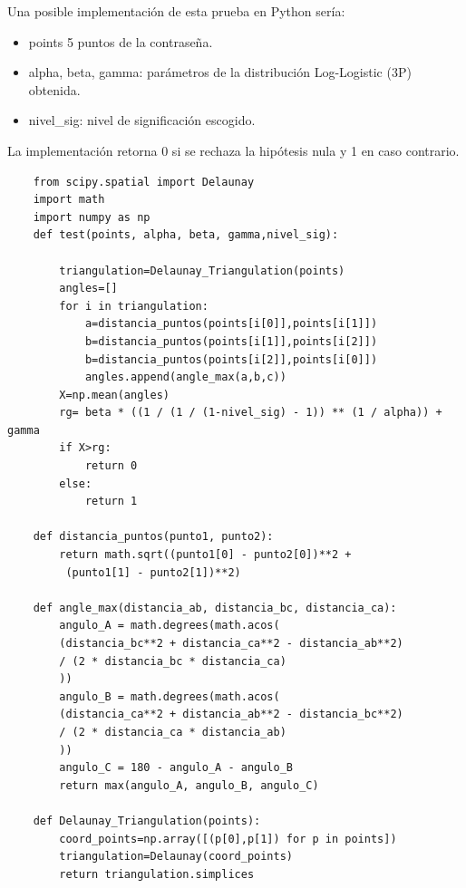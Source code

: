 \documentclass[12pt]{report}
\begin{document}
Una posible implementación de esta prueba en Python sería:




\begin{itemize}
	\item points 5 puntos de la contraseña.
	\item alpha, beta, gamma: parámetros de la distribución Log-Logistic (3P) obtenida.
	\item nivel\_sig: nivel de significación escogido.
	
\end{itemize}
La implementación retorna 0 si se rechaza la hipótesis nula y 1 en caso contrario. 





\begin{lstlisting}
	from scipy.spatial import Delaunay
	import math
	import numpy as np
	def test(points, alpha, beta, gamma,nivel_sig):
	
		triangulation=Delaunay_Triangulation(points)
		angles=[]
		for i in triangulation:
			a=distancia_puntos(points[i[0]],points[i[1]])
			b=distancia_puntos(points[i[1]],points[i[2]])
			b=distancia_puntos(points[i[2]],points[i[0]])
			angles.append(angle_max(a,b,c))     
		X=np.mean(angles) 
		rg= beta * ((1 / (1 / (1-nivel_sig) - 1)) ** (1 / alpha)) + gamma
		if X>rg:
			return 0
		else:
			return 1
	
	def distancia_puntos(punto1, punto2):
		return math.sqrt((punto1[0] - punto2[0])**2 +
		 (punto1[1] - punto2[1])**2)
	
	def angle_max(distancia_ab, distancia_bc, distancia_ca):
		angulo_A = math.degrees(math.acos(
		(distancia_bc**2 + distancia_ca**2 - distancia_ab**2) 
		/ (2 * distancia_bc * distancia_ca)
		))
		angulo_B = math.degrees(math.acos(
		(distancia_ca**2 + distancia_ab**2 - distancia_bc**2) 
		/ (2 * distancia_ca * distancia_ab)
		))
		angulo_C = 180 - angulo_A - angulo_B  
		return max(angulo_A, angulo_B, angulo_C)
		
	def Delaunay_Triangulation(points):
		coord_points=np.array([(p[0],p[1]) for p in points])
		triangulation=Delaunay(coord_points)
		return triangulation.simplices	
\end{lstlisting}
\end{document}
